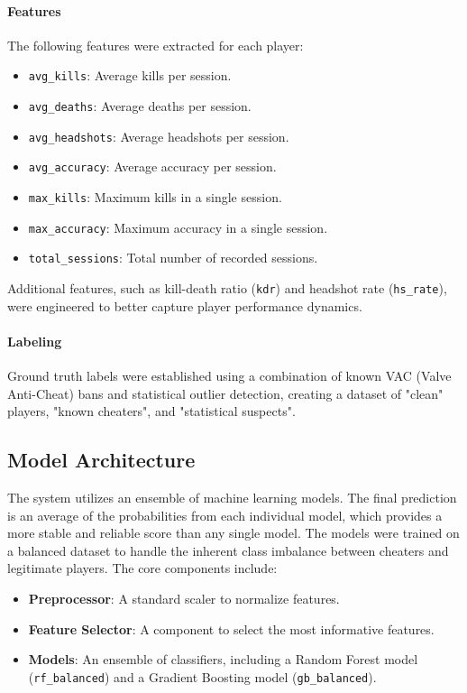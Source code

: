\documentclass{article}
\begin{document}
\paragraph{Features} The following features were extracted for each player:
\begin{itemize}
    \item \texttt{avg\_kills}: Average kills per session.
    \item \texttt{avg\_deaths}: Average deaths per session.
    \item \texttt{avg\_headshots}: Average headshots per session.
    \item \texttt{avg\_accuracy}: Average accuracy per session.
    \item \texttt{max\_kills}: Maximum kills in a single session.
    \item \texttt{max\_accuracy}: Maximum accuracy in a single session.
    \item \texttt{total\_sessions}: Total number of recorded sessions.
\end{itemize}

Additional features, such as kill-death ratio (\texttt{kdr}) and headshot rate (\texttt{hs\_rate}), were engineered to better capture player performance dynamics.

\paragraph{Labeling}
Ground truth labels were established using a combination of known VAC (Valve Anti-Cheat) bans and statistical outlier detection, creating a dataset of "clean" players, "known cheaters", and "statistical suspects".

\subsection{Model Architecture}
The system utilizes an ensemble of machine learning models. The final prediction is an average of the probabilities from each individual model, which provides a more stable and reliable score than any single model. The models were trained on a balanced dataset to handle the inherent class imbalance between cheaters and legitimate players. The core components include:
\begin{itemize}
    \item \textbf{Preprocessor}: A standard scaler to normalize features.
    \item \textbf{Feature Selector}: A component to select the most informative features.
    \item \textbf{Models}: An ensemble of classifiers, including a Random Forest model (\texttt{rf\_balanced}) and a Gradient Boosting model (\texttt{gb\_balanced}).
\end{itemize}
\end{document}
